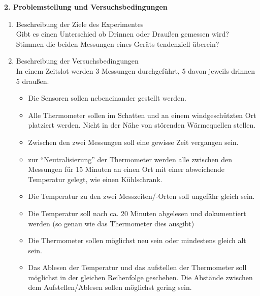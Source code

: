 \documentclass[ ngerman, fontsize= 12pt, paper=a4, headings=big, titlepage=true]{article}
\begin{document}
\textbf{2. Problemstellung und Versuchsbedingungen}
\begin{enumerate}[-]
\item Beschreibung der Ziele des Experimentes \\
	Gibt es einen Unterschied ob Drinnen oder Draußen gemessen wird?\\
	
	Stimmen die beiden Messungen eines Geräts tendenziell überein?\\
	
\item Beschreibung der Versuchsbedingungen\\

In einem Zeitslot werden 3 Messungen durchgeführt, 5 davon jeweils drinnen 5 draußen.


\begin{itemize}
	
\item Die Sensoren sollen nebeneinander gestellt werden.\\

\item Alle Thermometer sollen im Schatten und an einem windgeschützten Ort platziert werden. Nicht in der Nähe von störenden Wärmequellen stellen. \\

\item Zwischen den zwei Messungen soll eine gewisse Zeit vergangen sein.

\item zur \enquote{Neutralisierung} der Thermometer werden alle zwischen den Messungen für 15 Minuten an einen Ort mit einer abweichende Temperatur gelegt, wie einen Kühlschrank.

\item Die Temperatur zu den zwei Messzeiten/-Orten soll ungefähr gleich sein.

\item Die Temperatur soll nach ca. 20 Minuten abgelesen und dokumentiert werden (so genau wie das Thermometer dies ausgibt) 

\item Die Thermometer sollen möglichst neu sein oder mindestens gleich alt sein.

\item Das Ablesen der Temperatur und das aufstellen der Thermometer soll möglichst in der gleichen Reihenfolge geschehen. Die Abstände zwischen dem Aufstellen/Ablesen sollen möglichst gering sein.

\end{itemize}


\end{enumerate}
\end{document}
